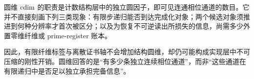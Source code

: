 \begin{remark}[圆维只计可见连通相位]\label{rem:cdim-visible-phase-not-reachability}
圆维 \(\operatorname{cdim}\) 的职责是计数结构层中的独立圆因子，即可见连通相位通道的数目。它并不直接刻画下列三类现象：有限步递归能否到达完成化对象；两个候选对象须推进到何种分辨率才首次被区分；以及为恢复不可逆读出所损失的信息，尚需多少外置零维纤维或 prime-register 账本。
\par
因此，有限纤维标签与离散证书轴不会增加结构圆维，却仍可能构成实现层中不可压缩的刚性开销。圆维回答的是“有多少条独立连续相位通道”，而非“这些通道在有限递归中是否足以独立承担完备信息”。
\end{remark}
